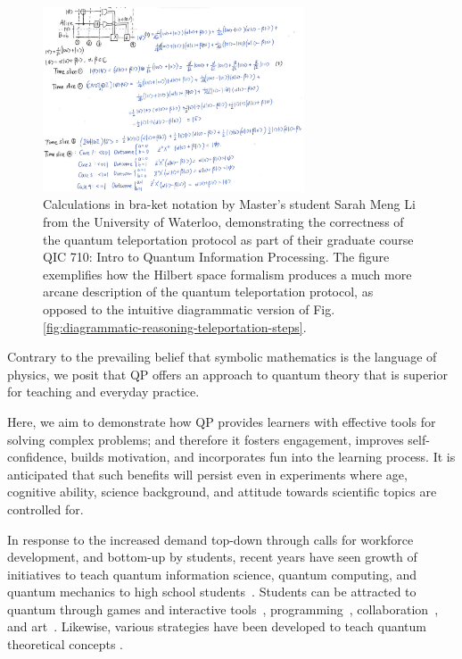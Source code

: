 \begin{figure}[ht]
\centering
\includegraphics[width=0.69\textwidth]{Sections/pictures/teleportation-learning.jpg}
\caption{
Calculations in bra-ket notation by Master's student Sarah Meng Li from the University of Waterloo, demonstrating the correctness of the quantum teleportation protocol as part of their graduate course QIC 710: Intro to Quantum Information Processing. The figure exemplifies how the Hilbert space formalism produces a much more arcane description of the quantum teleportation protocol, as opposed to the intuitive diagrammatic version of Fig. \ref{fig:diagrammatic-reasoning-teleportation-steps}.
}
\label{fig:teleportation-learning}
\end{figure}

Contrary to the prevailing belief that symbolic mathematics is the language of physics, we posit that QP offers an approach to quantum theory that is superior for teaching and everyday practice.

Here, we aim to demonstrate how QP provides learners with effective tools for solving complex problems; and therefore it fosters engagement, improves self-confidence, builds motivation, and incorporates fun into the learning process. It is anticipated that such benefits will persist even in experiments where age, cognitive ability, science background, and attitude towards scientific topics are controlled for.

In response to the increased demand top-down through calls for workforce development, and bottom-up by students, recent years have seen growth of initiatives to teach quantum information science, quantum computing, and quantum mechanics to high school students~\cite{QxQ,OxPhys,IQCqsys,walsh2021piloting,economou2020teaching}.
Students can be attracted to quantum through games and interactive tools~\cite{seskir2022quantumgames, lacour2022vqol, Migdal2022qflytrap, chungyuan2022, Marshman2022, entanglementball2021}, programming~\cite{mykhailova2022, salehiseskir2022, qiskittextbook2021}, collaboration~\cite{khodaeifaal2022, maldonadoromo2022}, and art~\cite{quantumatlas,uchicago2022multidisciplinary}.
Likewise, various strategies have been developed to teach quantum theoretical concepts \cite{hoekzema2007particle, boe2023secondary, huseby2019observation, di2020development, rudolph2017, epiqc2020reversibility}.

